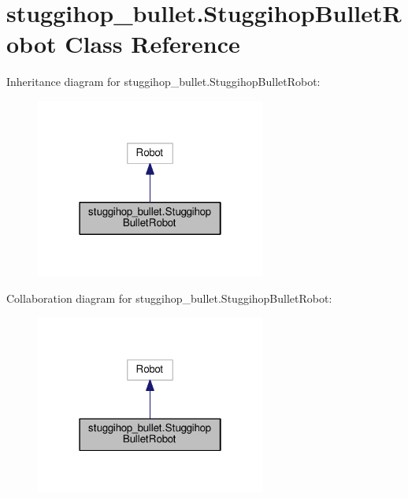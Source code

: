 \hypertarget{classstuggihop__bullet_1_1StuggihopBulletRobot}{}\section{stuggihop\+\_\+bullet.\+Stuggihop\+Bullet\+Robot Class Reference}
\label{classstuggihop__bullet_1_1StuggihopBulletRobot}


Inheritance diagram for stuggihop\+\_\+bullet.\+Stuggihop\+Bullet\+Robot\+:
\nopagebreak
\begin{figure}[H]
\begin{center}
\leavevmode
\includegraphics[width=214pt]{classstuggihop__bullet_1_1StuggihopBulletRobot__inherit__graph}
\end{center}
\end{figure}


Collaboration diagram for stuggihop\+\_\+bullet.\+Stuggihop\+Bullet\+Robot\+:
\nopagebreak
\begin{figure}[H]
\begin{center}
\leavevmode
\includegraphics[width=214pt]{classstuggihop__bullet_1_1StuggihopBulletRobot__coll__graph}
\end{center}
\end{figure}

